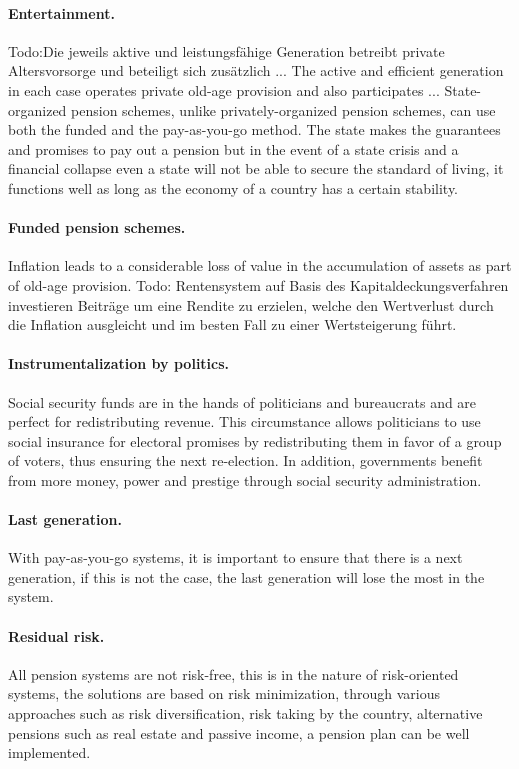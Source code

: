 \paragraph{Entertainment.} Todo:Die jeweils aktive und leistungsfähige Generation betreibt private Altersvorsorge und beteiligt sich zusätzlich ...
The active and efficient generation in each case operates private old-age provision and also participates ...
State-organized pension schemes, unlike privately-organized pension schemes, can use both the funded and the pay-as-you-go method.
The state makes the guarantees and promises to pay out a pension but in the event of a state crisis and a financial collapse even a state will not be able to secure the standard of living, it functions well as long as the economy of a country has a certain stability.

\paragraph{Funded pension schemes.} Inflation leads to a considerable loss of value in the accumulation of assets as part of old-age provision. 
Todo: 
Rentensystem auf Basis des Kapitaldeckungsverfahren investieren Beiträge um eine Rendite zu erzielen, welche den Wertverlust durch die Inflation ausgleicht und im besten Fall zu einer Wertsteigerung führt.

\paragraph{Instrumentalization by politics.} Social security funds are in the hands of politicians and bureaucrats and are perfect for redistributing revenue. This circumstance allows politicians to use social insurance for electoral promises by redistributing them in favor of a group of voters, thus ensuring the next re-election. In addition, governments benefit from more money, power and prestige through social security administration. \cite{zweifel_insurance_2012}

\paragraph{Last generation.} With pay-as-you-go systems, it is important to ensure that there is a next generation, if this is not the case, the last generation will lose the most in the system.

\paragraph{Residual risk.} All pension systems are not risk-free, this is in the nature of risk-oriented systems, the solutions are based on risk minimization, through various approaches such as risk diversification, risk taking by the country, alternative pensions such as real estate and passive income, a pension plan can be well implemented.


